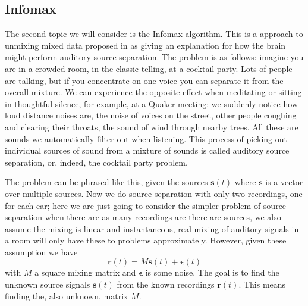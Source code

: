 
\subsection*{Infomax}

The second topic we will consider is the Infomax algorithm. This is a
approach to unmixing mixed data proposed in \cite{BellSejnowski1995}
as giving an explanation for how the brain might perform auditory
source separation. The problem is as follows: imagine you are in a
crowded room, in the classic telling, at a cocktail party. Lots of
people are talking, but if you concentrate on one voice you can
separate it from the overall mixture. We can experience the opposite
effect when meditating or sitting in thoughtful silence, for example,
at a Quaker meeting: we suddenly notice how loud distance noises are,
the noise of voices on the street, other people coughing and clearing
their throats, the sound of wind through nearby trees. All these are
sounds we automatically filter out when listening. This process of
picking out individual sources of sound from a mixture of sounds is
called auditory source separation, or, indeed, the cocktail party
problem.

The problem can be phrased like this, given the sources
$\textbf{s}(t)$ where $\textbf{s}$ is a vector over multiple
sources. Now we do source separation with only two recordings, one for
each ear; here we are just going to consider the simpler problem of
source separation when there are as many recordings are there are
sources, we also assume the mixing is linear and instantaneous, real mixing of auditory signals in a room will only have these to problems approximately. However, given these assumption we have
\begin{equation}
\mathbf{r}(t)=M\mathbf{s}(t)+\mathbf{\epsilon}(t)
\end{equation}
with $M$ a square mixing matrix and $\mathbf{\epsilon}$ is some
noise. The goal is to find the unknown source signals $\textbf{s}(t)$
from the known recordings $\textbf{r}(t)$. This means finding the,
also unknown, matrix $M$.

